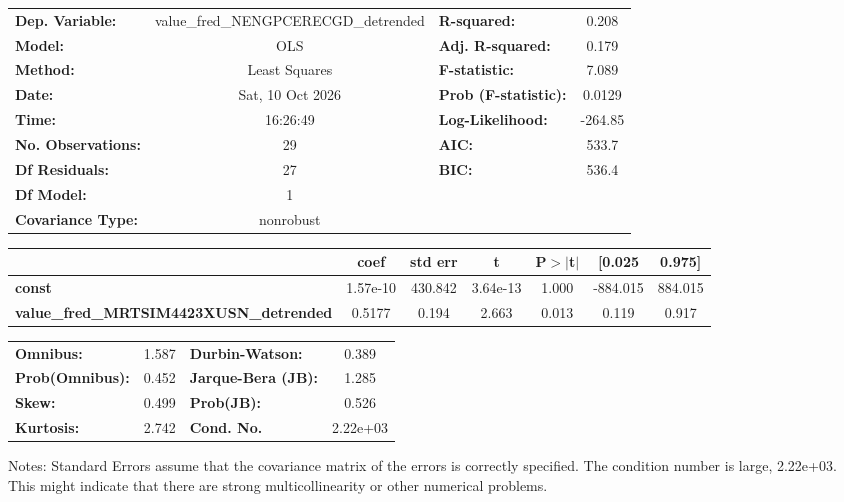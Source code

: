\begin{center}
\begin{tabular}{lclc}
\toprule
\textbf{Dep. Variable:}                         & value\_fred\_NENGPCERECGD\_detrended & \textbf{  R-squared:         } &     0.208   \\
\textbf{Model:}                                 &                 OLS                  & \textbf{  Adj. R-squared:    } &     0.179   \\
\textbf{Method:}                                &            Least Squares             & \textbf{  F-statistic:       } &     7.089   \\
\textbf{Date:}                                  &           Sat, 10 Oct 2026           & \textbf{  Prob (F-statistic):} &   0.0129    \\
\textbf{Time:}                                  &               16:26:49               & \textbf{  Log-Likelihood:    } &   -264.85   \\
\textbf{No. Observations:}                      &                    29                & \textbf{  AIC:               } &     533.7   \\
\textbf{Df Residuals:}                          &                    27                & \textbf{  BIC:               } &     536.4   \\
\textbf{Df Model:}                              &                     1                & \textbf{                     } &             \\
\textbf{Covariance Type:}                       &              nonrobust               & \textbf{                     } &             \\
\bottomrule
\end{tabular}
\begin{tabular}{lcccccc}
                                                & \textbf{coef} & \textbf{std err} & \textbf{t} & \textbf{P$> |$t$|$} & \textbf{[0.025} & \textbf{0.975]}  \\
\midrule
\textbf{const}                                  &     1.57e-10  &      430.842     &  3.64e-13  &         1.000        &     -884.015    &      884.015     \\
\textbf{value\_fred\_MRTSIM4423XUSN\_detrended} &       0.5177  &        0.194     &     2.663  &         0.013        &        0.119    &        0.917     \\
\bottomrule
\end{tabular}
\begin{tabular}{lclc}
\textbf{Omnibus:}       &  1.587 & \textbf{  Durbin-Watson:     } &    0.389  \\
\textbf{Prob(Omnibus):} &  0.452 & \textbf{  Jarque-Bera (JB):  } &    1.285  \\
\textbf{Skew:}          &  0.499 & \textbf{  Prob(JB):          } &    0.526  \\
\textbf{Kurtosis:}      &  2.742 & \textbf{  Cond. No.          } & 2.22e+03  \\
\bottomrule
\end{tabular}
\end{center}

Notes: \newline
 [1] Standard Errors assume that the covariance matrix of the errors is correctly specified. \newline
 [2] The condition number is large, 2.22e+03. This might indicate that there are \newline
 strong multicollinearity or other numerical problems.